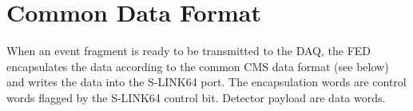 \section{Common Data Format}\label{sec:CommonFormat}

When an event fragment is ready to be transmitted to the DAQ, the FED
encapsulates the data according to the common CMS data format (see
below) and writes the data into the S-LINK64 port. The encapsulation
words are control words flagged by the S-LINK64 control bit. Detector
payload are data words.




